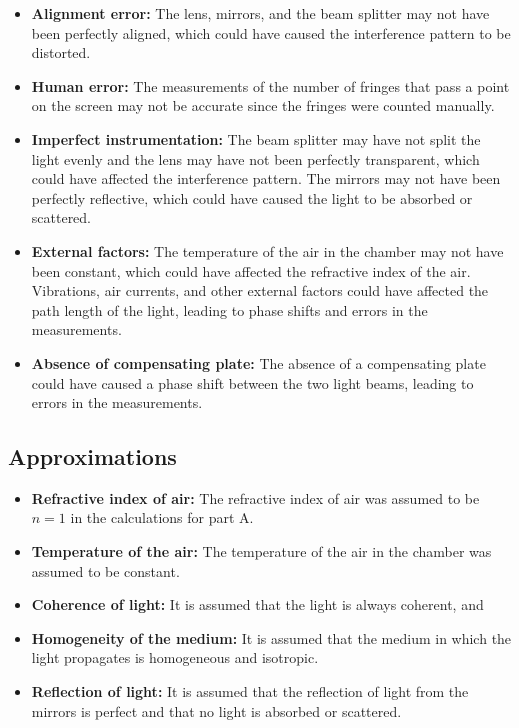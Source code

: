 \documentclass[10pt]{article}
\begin{document}
\begin{itemize}
  \item \textbf{Alignment error:} The lens, mirrors, and the beam splitter may not have been perfectly aligned, which could have caused the interference pattern to be distorted. 
  \item \textbf{Human error:} The measurements of the number of fringes that pass a point on the screen may not be accurate since the fringes were counted manually. 
  \item \textbf{Imperfect instrumentation:} The beam splitter may have not split the light evenly and the lens may have not been perfectly transparent, which could have affected the interference pattern. The mirrors may not have been perfectly reflective, which could have caused the light to be absorbed or scattered.
  \item \textbf{External factors:} The temperature of the air in the chamber may not have been constant, which could have affected the refractive index of the air. Vibrations, air currents, and other external factors could have affected the path length of the light, leading to phase shifts and errors in the measurements. 
  \item \textbf{Absence of compensating plate:} The absence of a compensating plate could have caused a phase shift between the two light beams, leading to errors in the measurements.
\end{itemize}

\subsection*{Approximations}
\begin{itemize}

\item \textbf{Refractive index of air:} The refractive index of air was assumed to be $n = 1$ in the calculations for part A.

\item \textbf{Temperature of the air:} The temperature of the air in the chamber was assumed to be constant. 

\item \textbf{Coherence of light:} It is assumed that the light is always coherent, and 

\item \textbf{Homogeneity of the medium:} It is assumed that the medium in which the light propagates is homogeneous and isotropic.

\item \textbf{Reflection of light:} It is assumed that the reflection of light from the mirrors is perfect and that no light is absorbed or scattered.

\end{itemize}
\end{document}
